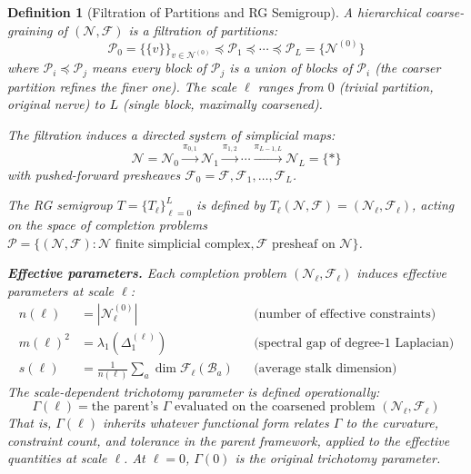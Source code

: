 \documentclass[11pt,letterpaper]{article}
\newtheorem{definition}[conjecture]{Definition}
\newcommand{\sheaf}{\mathcal{F}}
\newcommand{\nerve}{\mathcal{N}}
\newcommand{\block}{\mathcal{B}}
\newcommand{\partition}{\mathcal{P}}
\begin{document}
\begin{definition}[Filtration of Partitions and RG 
Semigroup]\label{def:rg_semigroup}
A \emph{hierarchical coarse-graining} of $(\nerve, \sheaf)$ is a 
filtration of partitions:
\begin{equation}\label{eq:filtration}
    \partition_0 = \{\{v\}\}_{v \in \nerve^{(0)}} 
    \preccurlyeq \partition_1 \preccurlyeq \cdots 
    \preccurlyeq \partition_L = \{\nerve^{(0)}\}
\end{equation}
where $\partition_i \preccurlyeq \partition_j$ means every block of 
$\partition_j$ is a union of blocks of $\partition_i$ (the coarser 
partition refines the finer one). The \emph{scale} $\ell$ ranges 
from $0$ (trivial partition, original nerve) to $L$ (single block, 
maximally coarsened).

The filtration induces a directed system of simplicial maps:
\begin{equation}\label{eq:directed_system}
    \nerve = \nerve_0 \xrightarrow{\pi_{0,1}} \nerve_1 
    \xrightarrow{\pi_{1,2}} \cdots 
    \xrightarrow{\pi_{L-1,L}} \nerve_L = \{*\}
\end{equation}
with pushed-forward presheaves $\sheaf_0 = \sheaf, \sheaf_1, 
\ldots, \sheaf_L$.

The \emph{RG semigroup} $T = \{T_\ell\}_{\ell = 0}^{L}$ is defined 
by $T_\ell(\nerve, \sheaf) = (\nerve_\ell, \sheaf_\ell)$, acting on 
the space of completion problems 
$\mathcal{P} = \{(\nerve, \sheaf) : \nerve \text{ finite simplicial 
complex}, \sheaf \text{ presheaf on } \nerve\}$.

\textbf{Effective parameters.} Each completion problem 
$(\nerve_\ell, \sheaf_\ell)$ induces effective parameters at 
scale $\ell$:
\begin{align}
    n(\ell) &= |\nerve_\ell^{(0)}| 
    && \text{(number of effective constraints)} 
    \label{eq:n_ell}\\
    m(\ell)^2 &= \lambda_1(\Delta_1^{(\ell)}) 
    && \text{(spectral gap of degree-1 Laplacian)} 
    \label{eq:m_ell}\\
    s(\ell) &= \frac{1}{n(\ell)} \sum_a \dim \sheaf_\ell(\block_a) 
    && \text{(average stalk dimension)} 
    \label{eq:s_ell}
\end{align}
The \emph{scale-dependent trichotomy parameter} is defined 
operationally:
\begin{equation}\label{eq:Gamma_ell}
    \Gamma(\ell) = \text{the parent's } \Gamma \text{ evaluated 
    on the coarsened problem } 
    (\nerve_\ell, \sheaf_\ell)
\end{equation}
That is, $\Gamma(\ell)$ inherits whatever functional form relates 
$\Gamma$ to the curvature, constraint count, and tolerance in the 
parent framework, applied to the effective quantities at scale 
$\ell$. At $\ell = 0$, $\Gamma(0)$ is the original trichotomy 
parameter.
\end{definition}
\end{document}
